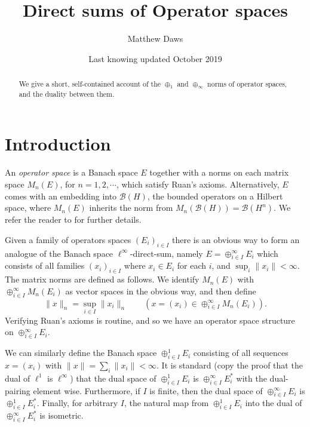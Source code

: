 \documentclass[a4paper,11pt]{article}
\theoremstyle{plain}
\theoremstyle{definition}
\newcommand{\mc}[1]{\mathcal{#1}}
\begin{document}
\title{Direct sums of Operator spaces}
\author{Matthew Daws}
\date{Last knowing updated October 2019}

\maketitle

\begin{abstract}
We give a short, self-contained account of the $\oplus_1$ and $\oplus_\infty$ norms of
operator spaces, and the duality between them.
\end{abstract}


\section{Introduction}

An \emph{operator space} is a Banach space $E$ together with a norms on each matrix
space $M_n(E)$, for $n=1,2,\cdots$, which satisfy Ruan's axioms.  Alternatively, $E$ comes
with an embedding into $\mc B(H)$, the bounded operators on a Hilbert space, where
$M_n(E)$ inherits the norm from $M_n(\mc B(H)) = \mc B(H^n)$.  We refer the reader to
\cite{er, pis, pau} for further details.

Given a family of operators spaces $(E_i)_{i\in I}$ there is an obvious way to form an
analogue of the Banach space $\ell^\infty$-direct-sum, namely $E = \oplus_{i\in I}^\infty
E_i$ which consists of all families $(x_i)_{i\in I}$ where $x_i\in E_i$ for each $i$,
and $\sup_i \|x_i\| < \infty$.  The matrix norms are defined as follows.  We identify
$M_n(E)$ with $\oplus_{i\in I}^\infty M_n(E_i)$ as vector spaces in the obvious way, and
then define
\[ \|x\|_n = \sup_{i\in I} \| x_i \|_n \qquad (x = (x_i) \in 
\oplus_{i\in I}^\infty M_n(E_i)). \]
Verifying Ruan's axioms is routine, and so we have an operator space structure on
$\oplus_{i\in I}^\infty E_i$.

We can similarly define the Banach space $\oplus_{i\in I}^1 E_i$ consisting of all
sequences $x = (x_i)$ with $\|x\| = \sum_i \|x_i\|<\infty$.  It is standard (copy
the proof that the dual of $\ell^1$ is $\ell^\infty$) that the dual space of
$\oplus_{i\in I}^1 E_i$ is $\oplus_{i\in I}^\infty E_i^*$ with the dual-pairing element
wise.  Furthermore, if $I$ is finite, then the dual space of
$\oplus_{i\in I}^\infty E_i$ is $\oplus_{i\in I}^1 E_i^*$.  Finally, for arbitrary $I$,
the natural map from $\oplus_{i\in I}^1 E_i$ into the dual of
$\oplus_{i\in I}^\infty E_i^*$ is isometric.
\end{document}
